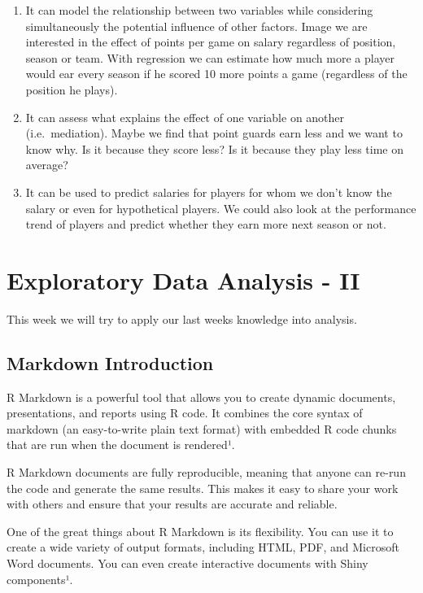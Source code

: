\documentclass[
]{book}
\begin{document}
\begin{enumerate}
\def\labelenumi{\arabic{enumi})}
\item
  It can model the relationship between two variables while considering simultaneously the potential influence of other factors. Image we are interested
  in the effect of points per game on salary regardless of position, season or team.
  With regression we can estimate how much more a player would ear every season
  if he scored 10 more points a game (regardless of the position he plays).
\item
  It can assess what explains the effect of one variable on another (i.e.~mediation). Maybe we find that point guards earn less and we want to know why. Is it because they score less? Is it because they play less time on average?
\item
  It can be used to predict salaries for players for whom we don't know the salary or even for hypothetical players. We could also look at the performance trend of players and predict whether they earn more next season or not.
\end{enumerate}

\hypertarget{eda-2}{%
\chapter{Exploratory Data Analysis - II}\label{eda-2}}

This week we will try to apply our last weeks knowledge into analysis.

\hypertarget{markdown-introduction}{%
\section{Markdown Introduction}\label{markdown-introduction}}

R Markdown is a powerful tool that allows you to create dynamic documents, presentations, and reports using R code. It combines the core syntax of markdown (an easy-to-write plain text format) with embedded R code chunks that are run when the document is rendered¹.

R Markdown documents are fully reproducible, meaning that anyone can re-run the code and generate the same results. This makes it easy to share your work with others and ensure that your results are accurate and reliable.

One of the great things about R Markdown is its flexibility. You can use it to create a wide variety of output formats, including HTML, PDF, and Microsoft Word documents. You can even create interactive documents with Shiny components¹.
\end{document}
